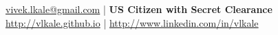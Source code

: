 \vspace{-0.4in}\href{mailto: vivek.lkale@gmail.com}{vivek.lkale@gmail.com} | \textbf{US Citizen with Secret Clearance} \\
\href{http://vlkale.github.io}{http://vlkale.github.io} |
\href{http://www.linkedin.com/in/vlkale}{http://www.linkedin.com/in/vlkale}